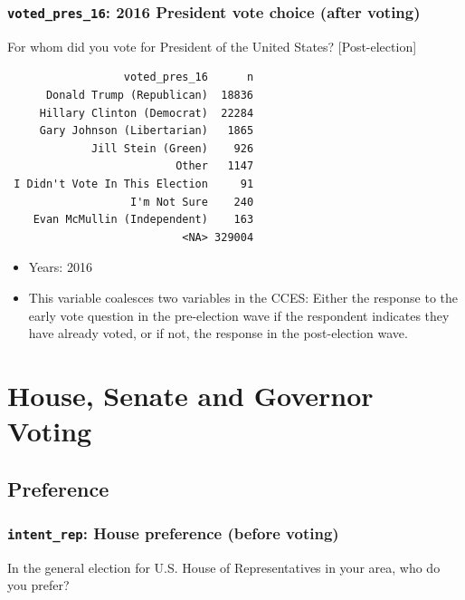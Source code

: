 \documentclass[10pt,article,oneside]{memoir}
\theoremstyle{definition}
\begin{document}
\subsubsection{\texorpdfstring{\texttt{voted\_pres\_16}: 2016 President
vote choice (after
voting)}{voted\_pres\_16: 2016 President vote choice (after voting)}}\label{voted_pres_16-2016-president-vote-choice-after-voting}

For whom did you vote for President of the United States?
{[}Post-election{]}

\begin{verbatim}
                  voted_pres_16      n
      Donald Trump (Republican)  18836
     Hillary Clinton (Democrat)  22284
     Gary Johnson (Libertarian)   1865
             Jill Stein (Green)    926
                          Other   1147
 I Didn't Vote In This Election     91
                   I'm Not Sure    240
    Evan McMullin (Independent)    163
                           <NA> 329004
\end{verbatim}

\begin{itemize}
\tightlist
\item
  Years: 2016
\item
  This variable coalesces two variables in the CCES: Either the response
  to the early vote question in the pre-election wave if the respondent
  indicates they have already voted, or if not, the response in the
  post-election wave.
\end{itemize}

\section{House, Senate and Governor
Voting}\label{house-senate-and-governor-voting}

\subsection{Preference}\label{preference}

\subsubsection{\texorpdfstring{\texttt{intent\_rep}: House preference
(before
voting)}{intent\_rep: House preference (before voting)}}\label{intent_rep-house-preference-before-voting}

In the general election for U.S. House of Representatives in your area,
who do you prefer?
\end{document}
